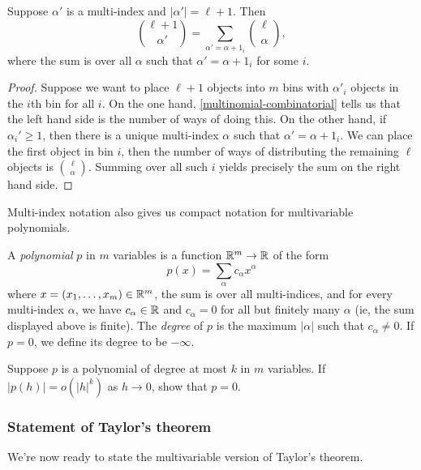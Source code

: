 \begin{corollary} \label{multinomial-recurrence}
	Suppose $\alpha'$ is a multi-index and $|\alpha'| = \ell + 1$. Then
	\[ \binom{\ell + 1}{\alpha'} = \sum_{\alpha' = \alpha + 1_i} \binom{\ell}{\alpha}, \]
	where the sum is over all $\alpha$ such that $\alpha' = \alpha + 1_i$ for some $i$. 
\end{corollary}

\begin{proof}
	Suppose we want to place $\ell + 1$ objects into $m$ bins with $\alpha'_i$ objects in the $i$th bin for all $i$. On the one hand, \cref{multinomial-combinatorial} tells us that the left hand side is the number of ways of doing this. On the other hand, if $\alpha_i' \geq 1$, then there is a unique multi-index $\alpha$ such that $\alpha' = \alpha + 1_i$. We can place the first object in bin $i$, then the number of ways of distributing the remaining $\ell$ objects is $\binom{\ell}{\alpha}$. Summing over all such $i$ yields precisely the sum on the right hand side. 
\end{proof}

Multi-index notation also gives us compact notation for multivariable polynomials. 

\begin{definition}
	A \emph{polynomial} $p$ in $m$ variables is a function $\mathbb{R}^m \to \mathbb{R}$ of the form
	\[ p(x) = \sum_\alpha c_\alpha x^\alpha \]
	where $x = (x_1, \dotsc, x_m) \in \mathbb{R}^m$, the sum is over all multi-indices, and for every multi-index $\alpha$, we have $c_\alpha \in \mathbb{R}$ and $c_\alpha = 0$ for all but finitely many $\alpha$ (ie, the sum displayed above is finite). The \emph{degree} of $p$ is the maximum $|\alpha|$ such that $c_\alpha \neq 0$. If $p = 0$, we define its degree to be $-\infty$. 
\end{definition}

\begin{exercise} \label{small-polynomial-is-zero}
	Suppose $p$ is a polynomial of degree at most $k$ in $m$ variables. If $|p(h)| = o(|h|^k)$ as $h \to 0$, show that $p = 0$. 
\end{exercise}

\subsubsection*{Statement of Taylor's theorem}

We're now ready to state the multivariable version of Taylor's theorem. 

